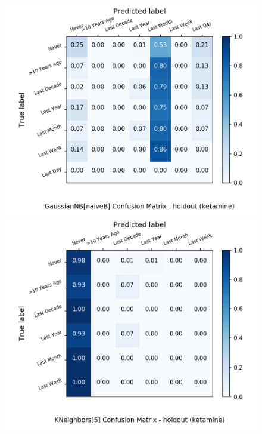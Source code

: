 \begin{figure}[H]
	\begin{minipage}[b]{0.32\textwidth}
		\includegraphics[width=1.1\textwidth]{Plots/drugs/ketamine_GaussianNB_naiveB_balance_False_holdout.png}
	\end{minipage}
	\begin{minipage}[b]{0.32\textwidth}
		\includegraphics[width=1.1\textwidth]{Plots/drugs/ketamine_KNeighbors_5_balance_False_holdout.png}
  \end{minipage}
	\begin{minipage}[b]{0.32\textwidth}

\end{minipage}
\end{figure}
